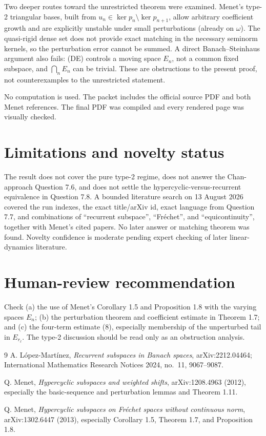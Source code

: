 \documentclass[10pt]{article}
\begin{document}
Two deeper routes toward the unrestricted theorem were examined.  Menet's type-2 triangular bases, built from $u_n\in\ker p_n\setminus\ker p_{n+1}$, allow arbitrary coefficient growth and are explicitly unstable under small perturbations (already on $\omega$).  The quasi-rigid dense set does not provide exact matching in the necessary seminorm kernels, so the perturbation error cannot be summed.  A direct Banach--Steinhaus argument also fails: (DE) controls a moving space $E_n$, not a common fixed subspace, and $\bigcap_nE_n$ can be trivial.  These are obstructions to the present proof, not counterexamples to the unrestricted statement.

No computation is used.  The packet includes the official source PDF and both Menet references.  The final PDF was compiled and every rendered page was visually checked.

\section*{Limitations and novelty status}

The result does not cover the pure type-2 regime, does not answer the Chan-approach Question 7.6, and does not settle the hypercyclic-versus-recurrent equivalence in Question 7.8.  A bounded literature search on 13 August 2026 covered the run indexes, the exact title/arXiv id, exact language from Question 7.7, and combinations of ``recurrent subspace'', ``Fr\'echet'', and ``equicontinuity'', together with Menet's cited papers.  No later answer or matching theorem was found.  Novelty confidence is moderate pending expert checking of later linear-dynamics literature.

\section*{Human-review recommendation}

Check (a) the use of Menet's Corollary 1.5 and Proposition 1.8 with the varying spaces $E_n$; (b) the perturbation theorem and coefficient estimate in Theorem 1.7; and (c) the four-term estimate (8), especially membership of the unperturbed tail in $E_{r_\ell}$.  The type-2 discussion should be read only as an obstruction analysis.

\begin{thebibliography}{9}
A. L\'opez-Mart\'inez,
\emph{Recurrent subspaces in Banach spaces},
arXiv:2212.04464; International Mathematics Research Notices 2024, no.~11, 9067--9087.

Q. Menet,
\emph{Hypercyclic subspaces and weighted shifts},
arXiv:1208.4963 (2012), especially the basic-sequence and perturbation lemmas and Theorem 1.11.

Q. Menet,
\emph{Hypercyclic subspaces on Fr\'echet spaces without continuous norm},
arXiv:1302.6447 (2013), especially Corollary 1.5, Theorem 1.7, and Proposition 1.8.
\end{thebibliography}
\end{document}
